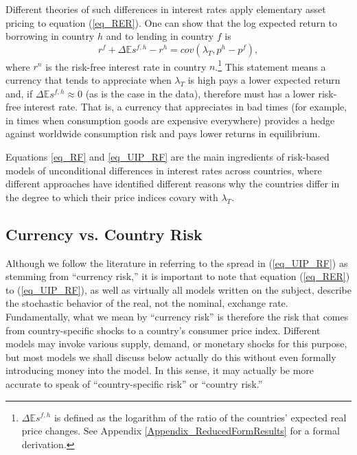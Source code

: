 \documentclass{ar-1col}
\begin{document}
Different theories of such differences in interest rates apply elementary asset pricing to equation (\ref{eq_RER}). One can show that the log expected return to borrowing in country $h$ and to lending in country $f$ is
\begin{equation}
  r^{f} + \Delta \mathbb{E} s^{f,h} - r^{h} =cov\left( \lambda _{T},p^{h}-p^{f}\right),
  \label{eq_UIP_RF}
\end{equation}%
where $r^{n}$ is the risk-free interest rate in country $n$.\footnote{$\Delta\mathbb{E}s^{f,h}$ is defined as the logarithm of the ratio of the countries' expected real price changes. See Appendix \ref{Appendix_ReducedFormResults} for a formal derivation.} This statement means a currency that tends to appreciate when $\lambda_T$ is high pays a lower expected return and, if $\Delta \mathbb{E} s^{f,h}\approx0$ (as is the case in the data), therefore must has a lower risk-free interest rate. That is, a currency that appreciates in bad times (for example, in times when consumption goods are expensive everywhere) provides a hedge against worldwide consumption risk and pays lower returns in equilibrium.

Equations \eqref{eq_RF} and \eqref{eq_UIP_RF} are the main ingredients of risk-based models of unconditional differences in interest rates across countries, where different approaches have identified different reasons why the countries differ in the degree to which their price indices covary with $\lambda_T$.

\begin{textbox}[h]
\section{Currency vs. Country Risk}
Although we follow the literature in referring to the spread in (\ref{eq_UIP_RF}) as stemming from ``currency risk,'' it is important to note that equation (\ref{eq_RER}) to (\ref{eq_UIP_RF}), as well as virtually all models written on the subject, describe the stochastic behavior of the real, not the nominal, exchange rate. Fundamentally, what we mean by ``currency risk'' is therefore the risk that comes from country-specific shocks to a country's consumer price index. Different models may invoke various supply, demand, or monetary shocks for this purpose, but most models we shall discuss below actually do this without even formally introducing money into the model. In this sense, it may actually be more accurate to speak of ``country-specific risk'' or ``country risk.'' 
\end{textbox}
\end{document}

